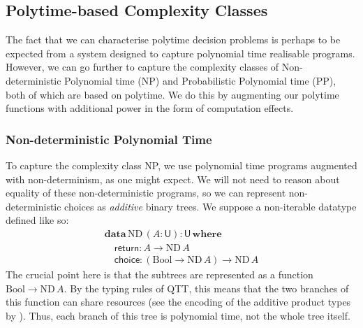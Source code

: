 \documentclass[acmsmall,screen]{acmart}
\newcommand{\BoolTy}{\mathrm{Bool}}
\begin{document}
\subsection{Polytime-based Complexity Classes}
\label{sec:classes}

The fact that we can characterise polytime decision problems is
perhaps to be expected from a system designed to capture polynomial
time realisable programs. However, we can go further to capture the
complexity classes of Non-deterministic Polynomial time (NP) and
Probabilistic Polynomial time (PP), both of which are based on
polytime. We do this by augmenting our polytime functions with
additional power in the form of computation effects.

\subsubsection{Non-deterministic Polynomial Time}
\label{sec:np-class}

To capture the complexity class NP, we use polynomial time programs
augmented with non-determinism, as one might expect. We will not need
to reason about equality of these non-deterministic programs, so we
can represent non-deterministic choices as \emph{additive} binary
trees. We suppose a non-iterable datatype defined like so:
\begin{displaymath}
  \begin{array}{l}
    \textbf{data}\,\mathrm{ND}\,(A : \mathsf{U}) : \mathsf{U}\,\textbf{where} \\
    \quad \mathsf{return} : A \to \mathrm{ND}\,A \\
    \quad \mathsf{choice} : (\BoolTy \to \mathrm{ND}\,A) \to \mathrm{ND}\,A
  \end{array}
\end{displaymath}
The crucial point here is that the subtrees are represented as a
function $\BoolTy \to \mathrm{ND}\,A$. By the typing rules of QTT,
this means that the two branches of this function can share resources
(see the encoding of the additive product types by
\citet{atkey18qtt}). Thus, each branch of this tree is polynomial
time, not the whole tree itself.
\end{document}
